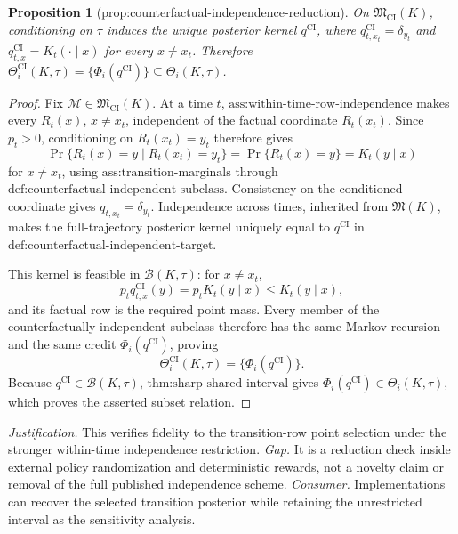\documentclass{article}
\newtheorem{proposition}{Proposition}
\begin{document}
\begin{proposition}[prop:counterfactual-independence-reduction]\label{prop:counterfactual-independence-reduction}
On \(\mathfrak M_{\mathrm{CI}}(K)\), conditioning on \(\tau\) induces the unique posterior kernel \(q^{\mathrm{CI}}\), where \(q_{t,x_t}^{\mathrm{CI}}=\delta_{y_t}\) and \(q_{t,x}^{\mathrm{CI}}=K_t(\cdot\mid x)\) for every \(x\ne x_t\). Therefore \(\Theta_i^{\mathrm{CI}}(K,\tau)=\{\Phi_i(q^{\mathrm{CI}})\}\subseteq\Theta_i(K,\tau)\).
\end{proposition}
\begin{proof}
Fix \(\mathcal M\in\mathfrak M_{\mathrm{CI}}(K)\).  At a time \(t\), \(\text{ass:within-time-row-independence}\) makes every \(R_t(x)\), \(x\ne x_t\), independent of the factual coordinate \(R_t(x_t)\).  Since \(p_t>0\), conditioning on \(R_t(x_t)=y_t\) therefore gives
\[
 \Pr\{R_t(x)=y\mid R_t(x_t)=y_t\}
 =\Pr\{R_t(x)=y\}=K_t(y\mid x)
\]
for \(x\ne x_t\), using \(\text{ass:transition-marginals}\) through \(\text{def:counterfactual-independent-subclass}\).  Consistency on the conditioned coordinate gives \(q_{t,x_t}=\delta_{y_t}\).  Independence across times, inherited from \(\mathfrak M(K)\), makes the full-trajectory posterior kernel uniquely equal to \(q^{\mathrm{CI}}\) in \(\text{def:counterfactual-independent-target}\).

This kernel is feasible in \(\mathcal B(K,\tau)\): for \(x\ne x_t\),
\[
 p_tq_{t,x}^{\mathrm{CI}}(y)=p_tK_t(y\mid x)\le K_t(y\mid x),
\]
and its factual row is the required point mass.  Every member of the counterfactually independent subclass therefore has the same Markov recursion and the same credit \(\Phi_i(q^{\mathrm{CI}})\), proving
\[
 \Theta_i^{\mathrm{CI}}(K,\tau)=\{\Phi_i(q^{\mathrm{CI}})\}.
\]
Because \(q^{\mathrm{CI}}\in\mathcal B(K,\tau)\), \(\text{thm:sharp-shared-interval}\) gives \(\Phi_i(q^{\mathrm{CI}})\in\Theta_i(K,\tau)\), which proves the asserted subset relation.
\end{proof}
\par\smallskip\noindent \textit{Justification.} This verifies fidelity to the transition-row point selection under the stronger within-time independence restriction. \textit{Gap.} It is a reduction check inside external policy randomization and deterministic rewards, not a novelty claim or removal of the full published independence scheme. \textit{Consumer.} Implementations can recover the selected transition posterior while retaining the unrestricted interval as the sensitivity analysis.
\end{document}
